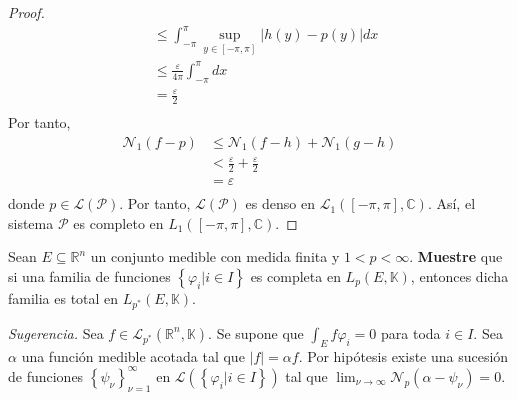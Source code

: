 \documentclass[12pt]{report}
\newcounter{it}
\theoremstyle{largebreak}
\newcommand\abs[1]{\ensuremath{\left|#1\right|}}
\newcommand{\N}[2]{\ensuremath{\mathcal{N}_{#1}\left(#2\right)}}
\begin{document}
\begin{proof}
\begin{equation*}
\begin{split}
                &\leq\int_{-\pi}^\pi\sup_{ y\in[-\pi,\pi]}\abs{h(y)-p(y)}dx\\
                &\leq\frac{\varepsilon}{4\pi}\int_{-\pi}^\pi dx\\
                &=\frac{\varepsilon}{2}\\
            \end{split}
        \end{equation*}
        Por tanto,
        \begin{equation*}
            \begin{split}
                \N{1}{f-p}&\leq\N{1}{f-h}+\N{1}{g-h}\\
                &<\frac{\varepsilon}{2}+\frac{\varepsilon}{2}\\
                &=\varepsilon\\
            \end{split}
        \end{equation*}
        donde $p\in\mathcal{L}(\mathcal{P})$. Por tanto, $\mathcal{L}(\mathcal{P})$ es denso en $\mathcal{L}_1([-\pi,\pi],\mathbb{C})$. Así, el sistema $\mathcal{P}$ es completo en $L_1([-\pi,\pi],\mathbb{C})$.

    \end{proof}

    \begin{excer}
        Sean $E\subseteq\mathbb{R}^n$ un conjunto medible con medida finita y $1<p<\infty$. \textbf{Muestre} que si una familia de funciones $\left\{\varphi_i\Big|i\in I \right\}$ es completa en $L_p(E,\mathbb{K})$, entonces dicha familia es total en $L_{p^*}(E,\mathbb{K})$.

        \textit{Sugerencia.} Sea $f\in\mathcal{L}_{p^*}(\mathbb{R}^n,\mathbb{K})$. Se supone que $\int_Ef\varphi_i=0$ para toda $i\in I$. Sea $\alpha$ una función medible acotada tal que $\abs{f}=\alpha f$. Por hipótesis existe una sucesión de funciones $\left\{\psi_\nu \right\}_{\nu=1}^\infty$ en $\mathcal{L}(\left\{\varphi_i\Big|i\in I \right\})$ tal que $\lim_{\nu\rightarrow\infty}\N{p}{\alpha-\psi_\nu}=0$.
    \end{excer}
\end{document}

